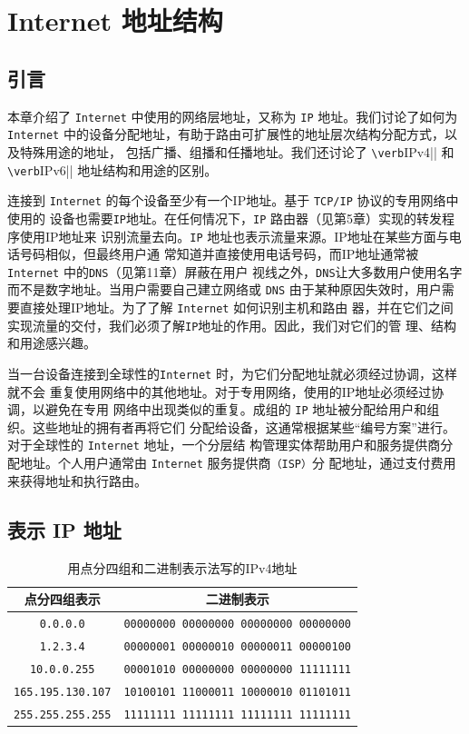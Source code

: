 \chapter{ Internet 地址结构}
\minitoc
\section{引言}
本章介绍了 \verb|Internet| 中使用的网络层地址，又称为 \verb|IP| 地址。我们讨论了如何为 \verb|Internet|
中的设备分配地址，有助于路由可扩展性的地址层次结构分配方式，以及特殊用途的地址，
包括广播、组播和任播地址。我们还讨论了 \verb|\verb|IPv4|| 和 \verb|\verb|IPv6|| 地址结构和用途的区别。

连接到 \verb|Internet| 的每个设备至少有一个IP地址。基于 \verb|TCP/IP| 协议的专用网络中使用的
设备也需要\verb|IP|地址。在任何情况下，\verb|IP| 路由器（见第5章）实现的转发程序使用IP地址来
识别流量去向。\verb|IP| 地址也表示流量来源。IP地址在某些方面与电话号码相似，但最终用户通
常知道并直接使用电话号码，而IP地址通常被 \verb|Internet| 中的\verb|DNS|（见第11章）屏蔽在用户
视线之外，\verb|DNS|让大多数用户使用名字而不是数字地址。当用户需要自己建立网络或 \verb|DNS|
由于某种原因失效时，用户需要直接处理IP地址。为了了解 \verb|Internet| 如何识别主机和路由
器，并在它们之间实现流量的交付，我们必须了解\verb|IP|地址的作用。因此，我们对它们的管
理、结构和用途感兴趣。

当一台设备连接到全球性的\verb|Internet| 时，为它们分配地址就必须经过协调，这样就不会
重复使用网络中的其他地址。对于专用网络，使用的IP地址必须经过协调，以避免在专用
网络中出现类似的重复。成组的 \verb|IP| 地址被分配给用户和组织。这些地址的拥有者再将它们
分配给设备，这通常根据某些“编号方案”进行。对于全球性的 \verb|Internet| 地址，一个分层结
构管理实体帮助用户和服务提供商分配地址。个人用户通常由 \verb|Internet| 服务提供商\verb|（ISP）|分
配地址，通过支付费用来获得地址和执行路由。

\section{表示 IP 地址}

\begin{table}[]
    \centering
    \label{tab:2.1}
    \caption{用点分四组和二进制表示法写的IPv4地址}
    \begin{tabular}{|c|c|}
        \hline
        点分四组表示             &                    二进制表示                \\ \hline
        \verb|0.0.0.0|         & \verb|00000000 00000000 00000000 00000000| \\ \hline
        \verb|1.2.3.4|         & \verb|00000001 00000010 00000011 00000100| \\ \hline
        \verb|10.0.0.255|      & \verb|00001010 00000000 00000000 11111111| \\ \hline
        \verb|165.195.130.107| & \verb|10100101 11000011 10000010 01101011| \\ \hline
        \verb|255.255.255.255| & \verb|11111111 11111111 11111111 11111111| \\ \hline
    \end{tabular}
\end{table}

